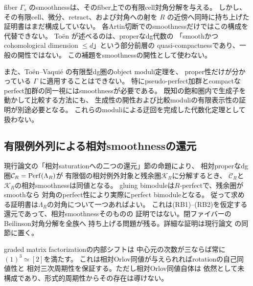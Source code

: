 \begin{remark}[現時点で未解決の点]\label{rem:relative-saturation-gap}
 fiber \(\Gamma_s\) のsmoothnessは、そのfiber上での有限cell対角分解を与える。
 しかし、その有限cell、微分、retract、および対角への射を
 \(R\) の近傍へ同時に持ち上げた証明書はまだ構成していない。
 各Artin切断でのsmoothnessだけではこの構成を代替できない。
 Toën \cite[Lemma 3.14]{ToenFinitude} が述べるのは、properなdg代数の
 「smoothかつcohomological dimension \(\le d\)」という部分前層の
 quasi-compactnessであり、一般の開性ではない。
 この補題をsmoothnessの開性として使わない。

 また、Toën--Vaquié \cite[Theorem 3.6]{TV} の有限型dg圏のobject moduli定理を、
 proper性だけが分かっている \(\Gamma\) に適用することはできない。
 特にpseudo-perfect加群とcompactなperfect加群の同一視にはsmoothnessが必要である。
 既知の飽和圏内で生成子を動かして比較する方法にも、
 生成性の開性および比較moduliの有限表示性の証明が別途必要となる。
 これらのmoduliによる迂回を完成した代数化定理として扱わない。
\end{remark}


\subsection{有限例外列による相対smoothnessの還元}
現行論文の「相対saturationへの二つの還元」節の命題により、
相対properなdg圏$\mathcal C_R=\operatorname{Perf}(\Lambda_R)$が
有限個の相対例外対象と残余圏$\mathcal K_R$に分解するとき、
$\mathcal C_R$と$\mathcal K_R$の相対smoothnessは同値となる。
gluing bimoduleは$R$-perfectで、残余圏がsmoothなら
対角のperfect性により実際にperfect bimoduleとなる。
従って求める証明書は$\Lambda_R$の対角について一つあればよい。
これは(RB1)--(RB2)を仮定する還元であって、相対smoothnessそのものの
証明ではない。閉ファイバーのBeilinson対角分解を全族へ
持ち上げる問題が残る。詳細な証明は現行論文
の同節に置く。

graded matrix factorizationの内部シフトは
中心元の次数が三ならば常に$(1)^3\simeq[2]$を満たす。
これは相対Orlov同値が与えられればrotationの自己同値性と
相対三次周期性を保証する。ただし相対Orlov同値自体は
依然として未構成であり、形式的周期性からその存在は導けない。

